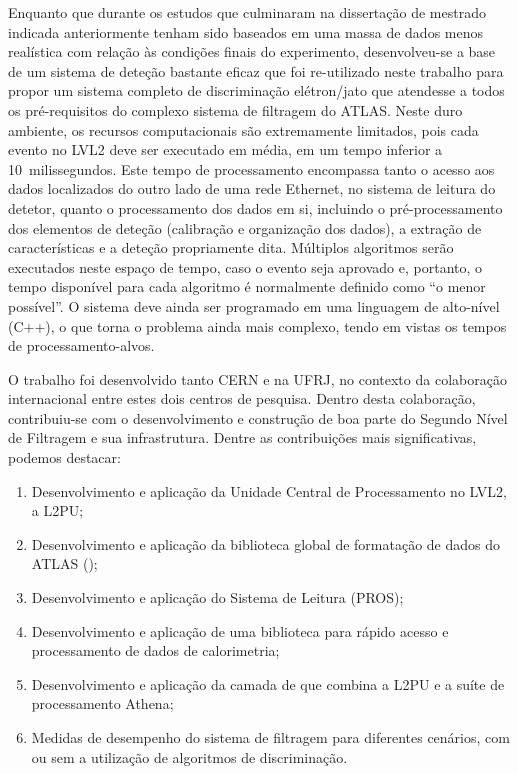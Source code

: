 Enquanto que durante os estudos que culminaram na dissertação de mestrado
indicada anteriormente tenham sido baseados em uma massa de dados menos
realística com relação às condições finais do experimento, desenvolveu-se a
base de um sistema de deteção bastante eficaz que foi re-utilizado neste
trabalho para propor um sistema completo de discriminação elétron/jato que
atendesse a todos os pré-requisitos do complexo sistema de filtragem do
ATLAS. Neste duro ambiente, os recursos computacionais são extremamente
limitados, pois cada evento no LVL2 deve ser executado em média, em um tempo
inferior a 10~milissegundos. Este tempo de processamento encompassa tanto o
acesso aos dados localizados do outro lado de uma rede Ethernet, no sistema de
leitura do detetor, quanto o processamento dos dados em si, incluindo o
pré-processamento dos elementos de deteção (calibração e organização dos
dados), a extração de características e a deteção propriamente dita. Múltiplos
algoritmos serão executados neste espaço de tempo, caso o evento seja aprovado
e, portanto, o tempo disponível para cada algoritmo é normalmente definido
como ``o menor possível''. O sistema deve ainda ser programado em uma
linguagem de alto-nível (C++), o que torna o problema ainda mais complexo,
tendo em vistas os tempos de processamento-alvos.

O trabalho foi desenvolvido tanto CERN e na UFRJ, no contexto da colaboração
internacional entre estes dois centros de pesquisa. Dentro desta colaboração,
contribuiu-se com o desenvolvimento e construção de boa parte do Segundo Nível
de Filtragem e sua infrastrutura. Dentre as contribuições mais significativas,
podemos destacar:

\begin{enumerate}
\item Desenvolvimento e aplicação da Unidade Central de Processamento no
LVL2, a L2PU;
\item Desenvolvimento e aplicação da biblioteca global de formatação de dados
do ATLAS ();
\item Desenvolvimento e aplicação do  Sistema de Leitura (PROS);
\item Desenvolvimento e aplicação de uma biblioteca para rápido acesso e
processamento de dados de calorimetria;
\item Desenvolvimento e aplicação da camada de  que combina a
L2PU e a suíte de processamento  Athena;
\item Medidas de desempenho do sistema de filtragem para diferentes cenários,
com ou sem a utilização de algoritmos de discriminação.
\end{enumerate}

